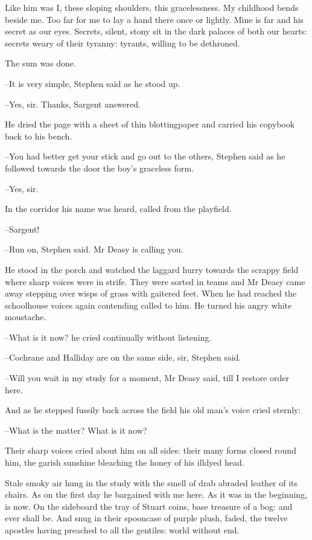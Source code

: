 Like him was I, these sloping shoulders, this gracelessness. My
childhood bends beside me. Too far for me to lay a hand there once or
lightly. Mine is far and his secret as our eyes. Secrets, silent, stony
sit in the dark palaces of both our hearts: secrets weary of their
tyranny: tyrants, willing to be dethroned.

The sum was done.

--It is very simple, Stephen said as he stood up.

--Yes, sir. Thanks, Sargent answered.

He dried the page with a sheet of thin blottingpaper and carried his
copybook back to his bench.

--You had better get your stick and go out to the others, Stephen said as
he followed towards the door the boy's graceless form.

--Yes, sir.

In the corridor his name was heard, called from the playfield.

--Sargent!

--Run on, Stephen said. Mr Deasy is calling you.

He stood in the porch and watched the laggard hurry towards the
scrappy field where sharp voices were in strife. They were sorted in teams
and Mr Deasy came away stepping over wisps of grass with gaitered feet.
When he had reached the schoolhouse voices again contending called to
him. He turned his angry white moustache.

--What is it now? he cried continually without listening.

--Cochrane and Halliday are on the same side, sir, Stephen said.

--Will you wait in my study for a moment, Mr Deasy said, till I restore
order here.

And as he stepped fussily back across the field his old man's voice
cried sternly:

--What is the matter? What is it now?

Their sharp voices cried about him on all sides: their many forms
closed round him, the garish sunshine bleaching the honey of his illdyed
head.

Stale smoky air hung in the study with the smell of drab abraded
leather of its chairs. As on the first day he bargained with me here. As
it was in the beginning, is now. On the sideboard the tray of Stuart
coins, base treasure of a bog: and ever shall be. And snug in their
spooncase of purple plush, faded, the twelve apostles having preached to
all the gentiles: world without end.

